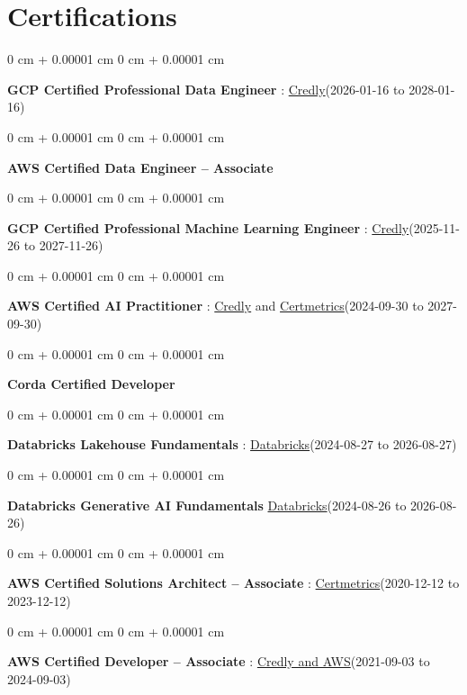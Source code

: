 \documentclass[10pt, letterpaper]{article}
\newenvironment{onecolentry}{
    \begin{adjustwidth}{
        0 cm + 0.00001 cm
    }{
        0 cm + 0.00001 cm
    }
}{
    \end{adjustwidth}
} %
\begin{document}
    \vspace{2 pt }
    \section{Certifications}
        \vspace{2 pt }
        \begin{samepage}
            \begin{onecolentry}
                \textbf{GCP Certified Professional Data Engineer} : \href{https://www.credly.com/badges/977e96d9-12e7-4f6c-b8a7-df71fb7153b8/public_url}{Credly}(2026-01-16 to 2028-01-16)
            \end{onecolentry}
            \begin{onecolentry}
                \textbf{AWS Certified Data Engineer – Associate}
            \end{onecolentry}
            \begin{onecolentry}
                \textbf{GCP Certified Professional Machine Learning Engineer} : \href{https://www.credly.com/badges/a6965347-09ea-4d8f-b398-0e151407160d/public_url}{Credly}(2025-11-26 to 2027-11-26)
            \end{onecolentry}
            \begin{onecolentry}
                \textbf{AWS Certified AI Practitioner} : \href{https://www.credly.com/badges/451b7ba5-8be1-4a8e-bbec-ade26627a6b6/public_url}{Credly} and \href{https://cp.certmetrics.com/amazon/en/public/verify/credential/495f0d9853874bf9a33c17f8e89ce131}{Certmetrics}(2024-09-30 to 2027-09-30)
            \end{onecolentry}
            \begin{onecolentry}
                \textbf{Corda Certified Developer}
            \end{onecolentry}
            \begin{onecolentry}
                \textbf{Databricks Lakehouse Fundamentals} : \href{https://scl.io/FXGKS0u}{Databricks}(2024-08-27 to 2026-08-27)
            \end{onecolentry}
            \begin{onecolentry}
                \textbf{Databricks Generative AI Fundamentals} \href{https://sgq.io/3uIFGNi}{Databricks}(2024-08-26 to 2026-08-26)
            \end{onecolentry}
            \begin{onecolentry}
                \textbf{AWS Certified Solutions Architect – Associate} : \href{https://cp.certmetrics.com/amazon/en/public/verify/credential/SNBY48EBJJVE1SWX}{Certmetrics}(2020-12-12 to 2023-12-12)
            \end{onecolentry}
            \begin{onecolentry}
                \textbf{AWS Certified Developer – Associate} : \href{https://www.credly.com/badges/b8106fbd-d3d1-4204-8cdf-e708798fd582/public_url}{Credly and AWS}(2021-09-03  to 2024-09-03)
            \end{onecolentry}
        \end{samepage}
\end{document}
